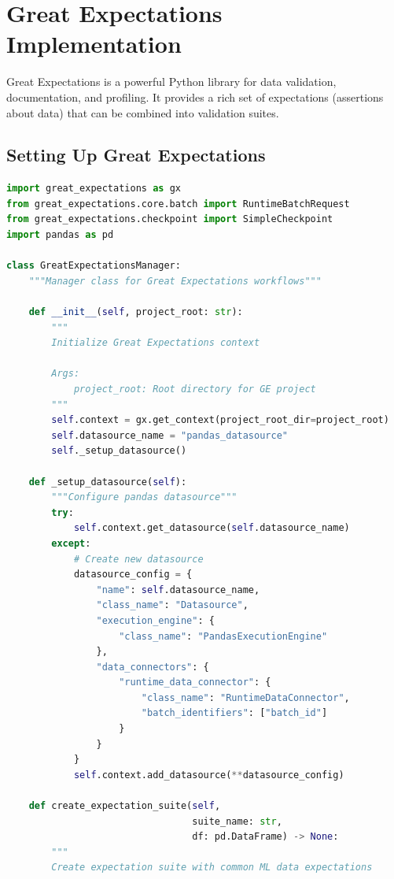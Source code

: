 \section{Great Expectations Implementation}

Great Expectations is a powerful Python library for data validation, documentation, and profiling. It provides a rich set of expectations (assertions about data) that can be combined into validation suites.

\subsection{Setting Up Great Expectations}

\begin{lstlisting}[language=Python, caption=Great Expectations Setup and Configuration]
import great_expectations as gx
from great_expectations.core.batch import RuntimeBatchRequest
from great_expectations.checkpoint import SimpleCheckpoint
import pandas as pd

class GreatExpectationsManager:
    """Manager class for Great Expectations workflows"""

    def __init__(self, project_root: str):
        """
        Initialize Great Expectations context

        Args:
            project_root: Root directory for GE project
        """
        self.context = gx.get_context(project_root_dir=project_root)
        self.datasource_name = "pandas_datasource"
        self._setup_datasource()

    def _setup_datasource(self):
        """Configure pandas datasource"""
        try:
            self.context.get_datasource(self.datasource_name)
        except:
            # Create new datasource
            datasource_config = {
                "name": self.datasource_name,
                "class_name": "Datasource",
                "execution_engine": {
                    "class_name": "PandasExecutionEngine"
                },
                "data_connectors": {
                    "runtime_data_connector": {
                        "class_name": "RuntimeDataConnector",
                        "batch_identifiers": ["batch_id"]
                    }
                }
            }
            self.context.add_datasource(**datasource_config)

    def create_expectation_suite(self,
                                 suite_name: str,
                                 df: pd.DataFrame) -> None:
        """
        Create expectation suite with common ML data expectations


\end{lstlisting}
